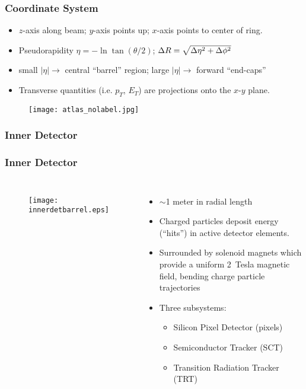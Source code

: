 \begin{frame}
\frametitle{Coordinate System}
\begin{itemize}
    \item $z$-axis along beam; $y$-axis points up; $x$-axis
        points to center of ring.
    \item Pseudorapidity $\eta = -\ln \tan(\theta/2)$; $\Delta R = \sqrt{\Delta \eta^2 + \Delta \phi^2}$
    \item small $|\eta| \to$ central ``barrel'' region; large
        $|\eta| \to$ forward ``end-caps''
    \item Transverse quantities (i.e. $p_T$, $E_T$) are projections
        onto the $x$-$y$ plane.
\end{itemize}
\begin{figure}
\centering
\texttt{[image: atlas\_nolabel.jpg]}
\end{figure}
\end{frame}


\subsubsection{Inner Detector}

\begin{frame}
\frametitle{Inner Detector}
\begin{columns}
\begin{figure}
\centering
\texttt{[image: innerdetbarrel.eps]}
\end{figure}
\begin{itemize}
    \item $\sim$1 meter in radial length
    \item Charged particles deposit energy (``hits'') in active
        detector elements.
    \item Surrounded by solenoid magnets which provide a uniform
        2~Tesla magnetic field, bending charge particle trajectories
    \item Three subsystems:
    \begin{itemize}
        \item Silicon Pixel Detector (pixels)
        \item Semiconductor Tracker (SCT)
        \item Transition Radiation Tracker (TRT)
    \end{itemize}
\end{itemize}
\end{columns}
\end{frame}

